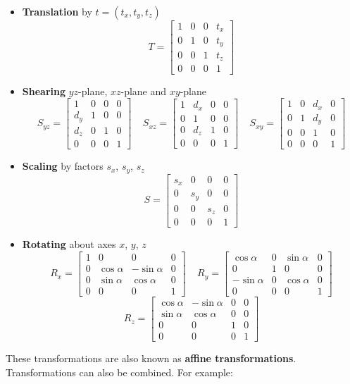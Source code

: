 \documentclass{article}
\begin{document}
\begin{itemize}
	\item \textbf{Translation} by $t = (t_x, t_y, t_z)$
	\[ T = \begin{bmatrix} 1 & 0 & 0 & t_x \\ 0 & 1 & 0 & t_y \\ 0 & 0 & 1 & t_z \\ 0 & 0 & 0 & 1 \end{bmatrix} \]
	
	\item \textbf{Shearing} $yz$-plane, $xz$-plane and $xy$-plane
	\[ S_{yz} = \begin{bmatrix} 1 & 0 & 0 & 0 \\ d_y & 1 & 0 & 0 \\ d_z & 0 & 1 & 0 \\ 0 & 0 & 0 & 1 \end{bmatrix} ~~~~~ S_{xz} = \begin{bmatrix} 1 & d_x & 0 & 0 \\ 0 & 1 & 0 & 0 \\ 0 & d_z & 1 & 0 \\ 0 & 0 & 0 & 1 \end{bmatrix} ~~~~~ S_{xy} = \begin{bmatrix} 1 & 0 & d_x & 0 \\ 0 & 1 & d_y & 0 \\ 0 & 0 & 1 & 0 \\ 0 & 0 & 0 & 1 \end{bmatrix} \]
	
	\item \textbf{Scaling} by factors $s_x$, $s_y$, $s_z$
	\[ S = \begin{bmatrix} s_x & 0 & 0 & 0 \\ 0 & s_y & 0 & 0 \\ 0 & 0 & s_z & 0 \\ 0 & 0 & 0 & 1 \end{bmatrix} \]
	
	\item \textbf{Rotating} about axes $x$, $y$, $z$
	\[ R_x = \begin{bmatrix} 1 & 0 & 0 & 0 \\ 0 & \cos \alpha & -\sin \alpha & 0 \\ 0 & \sin \alpha & \cos \alpha & 0 \\ 0 & 0 & 0 & 1 \end{bmatrix} ~~~~~ R_y = \begin{bmatrix} \cos \alpha & 0 & \sin \alpha & 0 \\ 0 & 1 & 0 & 0 \\ -\sin \alpha & 0 & \cos \alpha & 0 \\ 0 & 0 & 0 & 1 \end{bmatrix} \]
	\[ R_z = \begin{bmatrix} \cos \alpha & -\sin \alpha & 0 & 0 \\ \sin \alpha & \cos \alpha & 0 & 0 \\ 0 & 0 & 1 & 0 \\ 0 & 0 & 0 & 1 \end{bmatrix} \]
\end{itemize}
These transformations are also known as \textbf{affine transformations}. Transformations can also be combined. For example:
\end{document}
